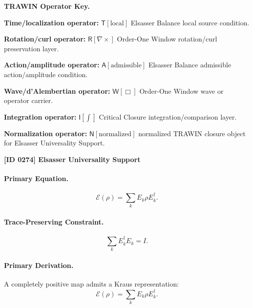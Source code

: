 \par\vspace{0.45\baselineskip}
\noindent\begin{minipage}[t]{\linewidth}
\begingroup
\small
\raggedright
\textbf{TRAWIN Operator Key.}\par
\noindent\textbf{Time/localization operator:} $\mathsf{T}\!\left[\mathrm{local}\right]$ Elsasser Balance local source condition.\par
\noindent\textbf{Rotation/curl operator:} $\mathsf{R}\!\left[\nabla\times\right]$ Order-One Window rotation/curl preservation layer.\par
\noindent\textbf{Action/amplitude operator:} $\mathsf{A}\!\left[\mathrm{admissible}\right]$ Elsasser Balance admissible action/amplitude condition.\par
\noindent\textbf{Wave/d'Alembertian operator:} $\mathsf{W}\!\left[\Box\right]$ Order-One Window wave or operator carrier.\par
\noindent\textbf{Integration operator:} $\mathsf{I}\!\left[\int\right]$ Critical Closure integration/comparison layer.\par
\noindent\textbf{Normalization operator:} $\mathsf{N}\!\left[\mathrm{normalized}\right]$ normalized TRAWIN closure object for Elsasser Universality Support.\par
\endgroup
\end{minipage}

\clearpage
\noindent\textbf{[ID 0274] Elsasser Universality Support}\par
\vspace{0.35em}
\paragraph{Primary Equation.}
\begin{equation}
\mathcal{E}(\rho)=\sum_k E_k\rho E_k^\dagger .
\end{equation}

\paragraph{Trace-Preserving Constraint.}
\begin{equation}
\sum_k E_k^\dagger E_k = I .
\end{equation}

\paragraph{Primary Derivation.}
A completely positive map admits a Kraus representation:
\begin{equation}
\mathcal{E}(\rho)=\sum_k E_k\rho E_k^\dagger .
\end{equation}

